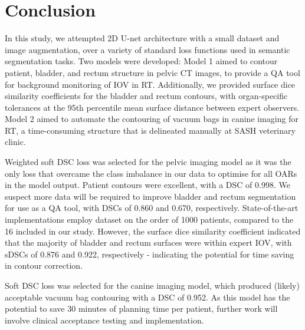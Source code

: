 \chapter{Conclusion}
\label{ch:conclusion}

In this study, we attempted 2D U-net architecture with a small dataset and image augmentation, over a variety of standard loss functions used in semantic segmentation tasks. Two models were developed: Model 1 aimed to contour patient, bladder, and rectum structure in pelvic CT images, to provide a QA tool for background monitoring of IOV in RT. Additionally, we provided surface dice similarity coefficients for the bladder and rectum contours, with organ-specific tolerances at the 95th percentile mean surface distance between expert observers. Model 2 aimed to automate the contouring of vacuum bags in canine imaging for RT, a time-consuming structure that is delineated manually at SASH veterinary clinic.

Weighted soft DSC loss was selected for the pelvic imaging model as it was the only loss that overcame the class imbalance in our data to optimise for all OARs in the model output. Patient contours were excellent, with a DSC of 0.998. We suspect more data will be required to improve bladder and rectum segmentation for use as a QA tool, with DSCs of 0.860 and 0.670, respectively. State-of-the-art implementations employ dataset on the order of 1000 patients, compared to the 16 included in our study. However, the surface dice similarity coefficient indicated that the majority of bladder and rectum surfaces were within expert IOV, with sDSCs of 0.876 and 0.922, respectively - indicating the potential for time saving in contour correction.

Soft DSC loss was selected for the canine imaging model, which produced (likely) acceptable vacuum bag contouring with a DSC of 0.952. As this model has the potential to save 30 minutes of planning time per patient, further work will involve clinical acceptance testing and implementation.


